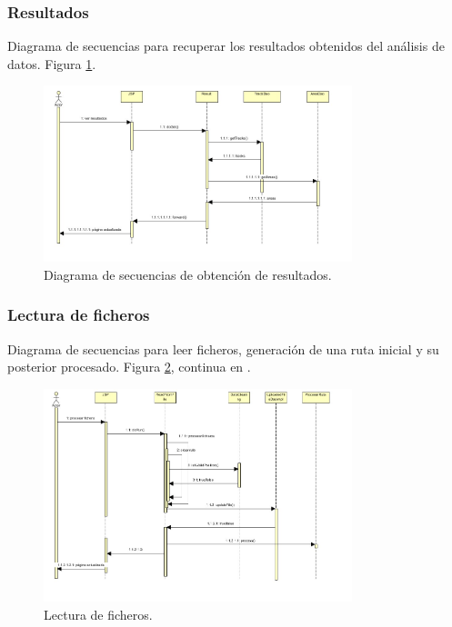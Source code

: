 \subsubsection{Resultados}
Diagrama de secuencias para recuperar los resultados obtenidos del análisis de datos. Figura \ref{resultados}.
\begin{figure}[!htbp]
  \centering
    \includegraphics[width=0.8\textwidth]{../img/diagramas/secuencias/14.jpg}
  \caption{Diagrama de secuencias de obtención de resultados.}
  \label{resultados}
\end{figure}

\subsubsection{Lectura de ficheros}
Diagrama de secuencias para leer ficheros, generación de una ruta inicial y su posterior procesado. Figura \ref{lectura}, continua en .
\begin{figure}[!htbp]
  \centering
    \includegraphics[width=0.8\textwidth]{../img/diagramas/secuencias/7.jpg}
  \caption{Lectura de ficheros.}
  \label{lectura}
\end{figure}

